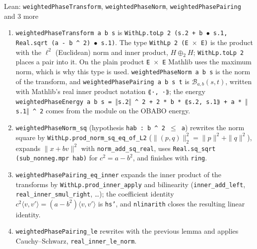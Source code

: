 \documentclass[11pt,a4paper]{article}
\begin{document}
\begin{leanbox}{Lean: \texttt{weightedPhaseTransform}, \texttt{weightedPhaseNorm}, \texttt{weightedPhasePairing} and 3 more}
\begin{enumerate}
\item \texttt{weighted\allowbreak{}Phase\allowbreak{}Transform a b s} is \texttt{With\allowbreak{}Lp.\allowbreak{}to\allowbreak{}Lp 2 (s.\allowbreak{}2 + b \ensuremath{\bullet} s.\allowbreak{}1, Real.\allowbreak{}sqrt (a -\allowbreak{} b \textasciicircum{} 2) \ensuremath{\bullet} s.\allowbreak{}1)}. The type \texttt{With\allowbreak{}Lp 2 (E \ensuremath{\times} E)} is the product with the \(\ell^2\) (Euclidean) norm and inner product, \(H\oplus_2H\); \texttt{With\allowbreak{}Lp.\allowbreak{}to\allowbreak{}Lp 2} places a pair into it. On the plain product \texttt{E \ensuremath{\times} E} Mathlib uses the maximum norm, which is why this type is used. \texttt{weighted\allowbreak{}Phase\allowbreak{}Norm a b s} is the norm of the transform, and \texttt{weighted\allowbreak{}Phase\allowbreak{}Pairing a b s t} is \(\mathcal B_{a,b}(s,t)\), written with Mathlib's real inner product notation \texttt{{\leanfallback ⟪}·, ·{\leanfallback ⟫}}; the energy \texttt{weighted\allowbreak{}Phase\allowbreak{}Energy a b s = \ensuremath{\Vert}s.\allowbreak{}2\ensuremath{\Vert} \textasciicircum{} 2 + 2 * b * {\leanfallback ⟪}s.\allowbreak{}2, s.\allowbreak{}1{\leanfallback ⟫} + a * \ensuremath{\Vert}s.\allowbreak{}1\ensuremath{\Vert} \textasciicircum{} 2} comes from the module on the OBABO energy.

\item \texttt{weighted\allowbreak{}Phase\allowbreak{}Norm\_\allowbreak{}sq} (hypothesis \texttt{hab : b \textasciicircum{} 2 \ensuremath{\le} a}) rewrites the norm square by \texttt{With\allowbreak{}Lp.\allowbreak{}prod\_\allowbreak{}norm\_\allowbreak{}sq\_\allowbreak{}eq\_\allowbreak{}of\_\allowbreak{}L2} (\(\|(p,q)\|_2^2=\|p\|^2+\|q\|^2\)), expands \(\|x+bv\|^2\) with \texttt{norm\_\allowbreak{}add\_\allowbreak{}sq\_\allowbreak{}real}, uses \texttt{Real.\allowbreak{}sq\_\allowbreak{}sqrt (sub\_\allowbreak{}nonneg.\allowbreak{}mpr hab)} for \(c^2=a-b^2\), and finishes with \texttt{ring}.

\item \texttt{weighted\allowbreak{}Phase\allowbreak{}Pairing\_\allowbreak{}eq\_\allowbreak{}inner} expands the inner product of the transforms by \texttt{With\allowbreak{}Lp.\allowbreak{}prod\_\allowbreak{}inner\_\allowbreak{}apply} and bilinearity (\texttt{inner\_\allowbreak{}add\_\allowbreak{}left}, \texttt{real\_\allowbreak{}inner\_\allowbreak{}smul\_\allowbreak{}right}, …); the coefficient identity \(c^2\langle v,v'\rangle=(a-b^2)\langle v,v'\rangle\) is \texttt{hs'}, and \texttt{nlinarith} closes the resulting linear identity.

\item \texttt{weighted\allowbreak{}Phase\allowbreak{}Pairing\_\allowbreak{}le} rewrites with the previous lemma and applies Cauchy–Schwarz, \texttt{real\_\allowbreak{}inner\_\allowbreak{}le\_\allowbreak{}norm}.

\end{enumerate}
\end{leanbox}
\end{document}
